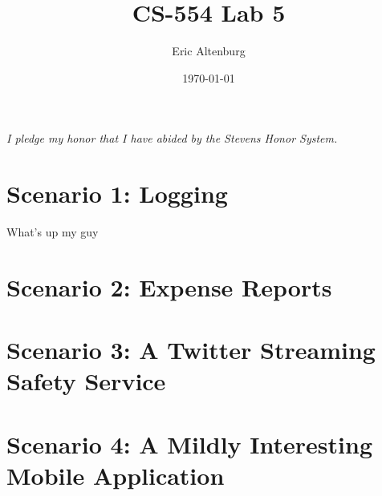 \documentclass[11pt]{article}
\title{CS-554 Lab 5}
\author{Eric Altenburg}
\date{\today}
\begin{document}
	\maketitle

	\begin{center}
		\textit{I pledge my honor that I have abided by the Stevens Honor System.}
	\end{center}

	\section*{Scenario 1: Logging}



	What's up my guy

	\section*{Scenario 2: Expense Reports}

	\section*{Scenario 3: A Twitter Streaming Safety Service}

	\section*{Scenario 4: A Mildly Interesting Mobile Application}
	
\end{document}
